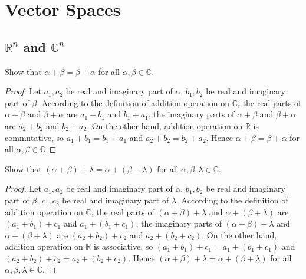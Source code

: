\chapter{Vector Spaces}

\section{$\mathbb{R}^{n}$ and $\mathbb{C}^{n}$}

\begin{exercise}
    Show that $\alpha + \beta = \beta + \alpha$ for all $\alpha, \beta\in \mathbb{C}$.
\end{exercise}

\begin{proof}
    Let $a_{1}, a_{2}$ be real and imaginary part of $\alpha$, $b_{1}, b_{2}$ be real and imaginary part of $\beta$. According to the definition of addition operation on $\mathbb{C}$, the real parts of $\alpha + \beta$ and $\beta + \alpha$ are $a_{1} + b_{1}$ and $b_{1} + a_{1}$, the imaginary parts of $\alpha + \beta$ and $\beta + \alpha$ are $a_{2} + b_{2}$ and $b_{2} + a_{2}$. On the other hand, addition operation on $\mathbb{R}$ is commutative, so $a_{1} + b_{1} = b_{1} + a_{1}$ and $a_{2} + b_{2} = b_{2} + a_{2}$. Hence $\alpha + \beta = \beta + \alpha$ for all $\alpha, \beta\in \mathbb{C}$
\end{proof}

\begin{exercise}
    Show that $(\alpha + \beta) + \lambda = \alpha + (\beta + \lambda)$ for all $\alpha, \beta, \lambda\in \mathbb{C}$.
\end{exercise}

\begin{proof}
    Let $a_{1}, a_{2}$ be real and imaginary part of $\alpha$, $b_{1}, b_{2}$ be real and imaginary part of $\beta$, $c_{1}, c_{2}$ be real and imaginary part of $\lambda$. According to the definition of addition operation on $\mathbb{C}$, the real parts of $(\alpha + \beta) + \lambda$ and $\alpha + (\beta + \lambda)$ are $(a_{1} + b_{1}) + c_{1}$ and $a_{1} + (b_{1} + c_{1})$, the imaginary parts of $(\alpha + \beta) + \lambda$ and $\alpha + (\beta + \lambda)$ are $(a_{2} + b_{2}) + c_{2}$ and $a_{2} + (b_{2} + c_{2})$. On the other hand, addition operation on $\mathbb{R}$ is associative, so $(a_{1} + b_{1}) + c_{1} = a_{1} + (b_{1} + c_{1})$ and $(a_{2} + b_{2}) + c_{2} = a_{2} + (b_{2} + c_{2})$. Hence $(\alpha + \beta) + \lambda = \alpha + (\beta + \lambda)$ for all $\alpha, \beta, \lambda\in \mathbb{C}$.
\end{proof}

